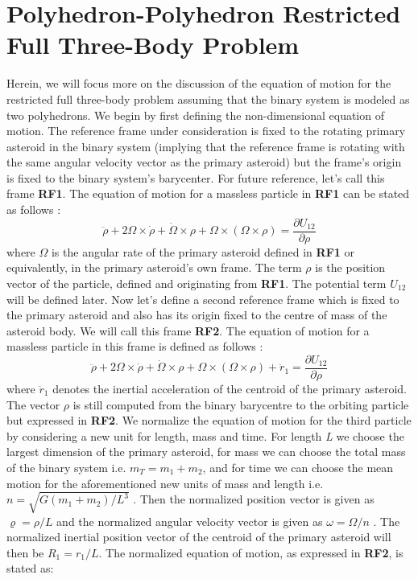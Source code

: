 \section{Polyhedron-Polyhedron Restricted Full Three-Body Problem}
\label{PPRFTBP}
Herein, we will focus more on the discussion of the equation of motion for the restricted full three-body problem assuming that the binary system is modeled as two polyhedrons. We begin by first defining the non-dimensional equation of motion. The reference frame under consideration is fixed to the rotating primary asteroid in the binary system (implying that the reference frame is rotating with the same angular velocity vector as the primary asteroid) but the frame's origin is fixed to the binary system's barycenter. For future reference, let's call this frame \textbf{RF1}. The equation of motion for a massless particle in \textbf{RF1} can be stated as follows \cite{dan_tbp}:
\begin{equation}
\label{eom1}
\ddot{\rho} + 2\Omega \times \dot{\rho} + \dot{\Omega} \times \rho + \Omega \times (\Omega \times \rho) = \frac{\partial U_{12}}{\partial \rho}
\end{equation}
%
where $\Omega$ is the angular rate of the primary asteroid defined in \textbf{RF1} or equivalently, in the primary asteroid's own frame. The term $\rho$ is the position vector of the particle, defined and originating from \textbf{RF1}. The potential term $U_{12}$ will be defined later. Now let's define a second reference frame which is fixed to the primary asteroid and also has its origin fixed to the centre of mass of the asteroid body. We will call this frame \textbf{RF2}. The equation of motion for a massless particle in this frame is defined as follows \cite{fahn_phd}:
\begin{equation}
\label{eom2}
\ddot{\rho} + 2\Omega \times \dot{\rho} + \dot{\Omega} \times \rho + \Omega \times (\Omega \times \rho) + \ddot{r}_1 = \frac{\partial U_{12}}{\partial \rho}
\end{equation}
%
where $\ddot{r}_1$ denotes the inertial acceleration of the centroid of the primary asteroid. The vector $\rho$ is still computed from the binary barycentre to the orbiting particle but expressed in \textbf{RF2}. We normalize the equation of motion for the third particle by considering a new unit for length, mass and time. For length \textit{L} we choose the largest dimension of the primary asteroid, for mass we can choose the total mass of the binary system i.e. $m_T = m_1 + m_2$, and for time we can choose the mean motion for the aforementioned new units of mass and length i.e. $n = \sqrt{G(m_1 + m_2)/L^3}$ \cite{fahn_phd}. Then the normalized position vector is given as $\varrho = \rho/L$ and the normalized angular velocity vector is given as $\omega = \Omega/n$ \cite{dan_tbp}. The normalized inertial position vector of the centroid of the primary asteroid will then be $R_1 = r_1/L$. The normalized equation of motion, as expressed in \textbf{RF2}, is stated as:
